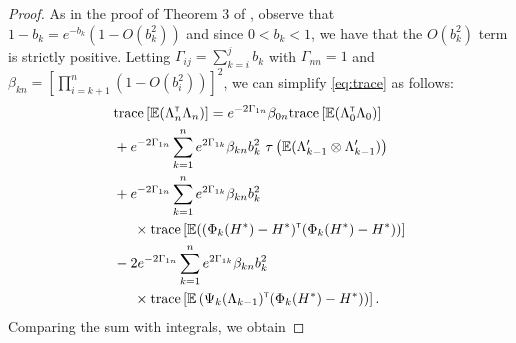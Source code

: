 \begin{proof}
As in the proof of Theorem 3 of \cite{spall-jacobian}, observe that $1-b_k = e^{-b_k}(1-O(b_k^2))$ and since $0 < b_k <1$, we have that the $O(b_k^2)$ term is strictly positive. 
Letting $\Gamma_{ij} = \sum_{k=i}^j b_k$ with $\Gamma_{nn} = 1$ and $\beta_{kn} = \left[\prod_{i=k+1}^n (1- O(b_i^2))\right]^2$, we can simplify \eqref{eq:trace} as follows:
\begin{align}\label{eq:wij}
 & \text{trace} \left[\E (\Lambda_n \tr \Lambda_n)\right] = e^{-2 \Gamma_{1n}} \beta_{0n} \text{trace} \left[\E (\Lambda_0 \tr \Lambda_0)\right]  \nonumber\\ &+ e^{-2 \Gamma_{1n}} \sum_{k=1}^n e^{2 \Gamma_{1k}} \beta_{kn} b_k^2  \,\,\tau\left(\E (\Lambda_{k-1}' \otimes \Lambda_{k-1}')\right)  \nonumber\\ &+ e^{-2 \Gamma_{1n}} \sum_{k=1}^n e^{2 \Gamma_{1k}} \beta_{kn} b_k^2  \nonumber\\&  \hspace{0.5cm}\times \text{trace}\left[\E ((\Phi_k(H^*) - H^*) \tr  (\Phi_k(H^*) - H^*))\right] \nonumber\\ &- 2 e^{-2 \Gamma_{1n}} \sum_{k=1}^n e^{2 \Gamma_{1k}} \beta_{kn} b_k^2  \nonumber\\& \hspace{0.5cm} \times \text{trace} \left[\E\left(\Psi_k(\Lambda_{k-1}) \tr (\Phi_k(H^*) - H^*)\right)\right] .
 \end{align} 
Comparing the sum with integrals, we obtain

\end{proof}
